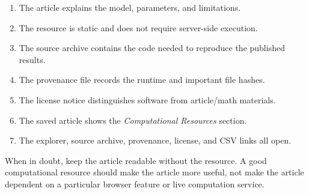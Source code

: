 \begin{enumerate}
\item The article explains the model, parameters, and limitations.
\item The resource is static and does not require server-side execution.
\item The source archive contains the code needed to reproduce the published
      results.
\item The provenance file records the runtime and important file hashes.
\item The license notice distinguishes software from article/math materials.
\item The saved article shows the \emph{Computational Resources} section.
\item The explorer, source archive, provenance, license, and CSV links all open.
\end{enumerate}

When in doubt, keep the article readable without the resource.  A good
computational resource should make the article more useful, not make the article
dependent on a particular browser feature or live computation service.
